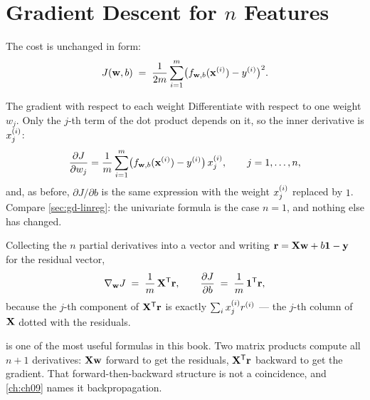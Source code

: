 \section{Gradient Descent for \texorpdfstring{$n$}{n} Features}
\label{sec:gd-multi}

The cost is unchanged in form:
\[
  J(\mathbf{w}, b) \;=\; \frac{1}{2m}\sum_{i=1}^{m}
    \bigl(f_{\mathbf{w},b}(\mathbf{x}^{(i)}) - y^{(i)}\bigr)^{2} .
\]

\begin{derivation}{The gradient with respect to each weight}
Differentiate with respect to one weight $w_j$. Only the $j$-th term of the dot
product depends on it, so the inner derivative is $x^{(i)}_{j}$:
\[
  \frac{\partial J}{\partial w_j}
    = \frac{1}{m}\sum_{i=1}^{m}
      \bigl(f_{\mathbf{w},b}(\mathbf{x}^{(i)}) - y^{(i)}\bigr)\,x^{(i)}_{j},
  \qquad j = 1,\dots,n,
\]
and, as before, $\partial J/\partial b$ is the same expression with the weight
$x^{(i)}_{j}$ replaced by $1$. Compare \cref{sec:gd-linreg}: the univariate
formula is the case $n=1$, and nothing else has changed.

Collecting the $n$ partial derivatives into a vector and writing
$\mathbf{r} = \mathbf{X}\mathbf{w} + b\mathbf{1} - \mathbf{y}$ for the residual vector,
\begin{equation}
  \nabla_{\mathbf{w}} J \;=\; \frac{1}{m}\,\mathbf{X}^{\mathsf{T}}\mathbf{r},
  \qquad
  \frac{\partial J}{\partial b} \;=\; \frac{1}{m}\,\mathbf{1}^{\mathsf{T}}\mathbf{r},
  \label{eq:vector-gradient}
\end{equation}
because the $j$-th component of $\mathbf{X}^{\mathsf{T}}\mathbf{r}$ is exactly
$\sum_i x^{(i)}_{j} r^{(i)}$ --- the $j$-th column of $\mathbf{X}$ dotted with the
residuals.
\end{derivation}

 is one of the most useful formulas in this book. Two
matrix products compute all $n+1$ derivatives: $\mathbf{X}\mathbf{w}$ forward to get the
residuals, $\mathbf{X}^{\mathsf{T}}\mathbf{r}$ backward to get the gradient. That
forward-then-backward structure is not a coincidence, and \cref{ch:ch09} names
it backpropagation.

